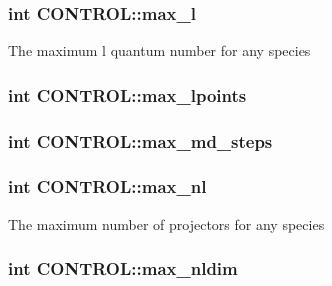 \hypertarget{struct_c_o_n_t_r_o_l_adf291a204dc806bab335d12c5bea8e51}{
\subsubsection[{max\-\_\-l}]{\setlength{\rightskip}{0pt plus 5cm}int C\-O\-N\-T\-R\-O\-L\-::max\-\_\-l}}\label{struct_c_o_n_t_r_o_l_adf291a204dc806bab335d12c5bea8e51}
The maximum l quantum number for any species \hypertarget{struct_c_o_n_t_r_o_l_aec8eaf77ca605bbbeb7c4d276935a177}{
\subsubsection[{max\-\_\-lpoints}]{\setlength{\rightskip}{0pt plus 5cm}int C\-O\-N\-T\-R\-O\-L\-::max\-\_\-lpoints}}\label{struct_c_o_n_t_r_o_l_aec8eaf77ca605bbbeb7c4d276935a177}
\hypertarget{struct_c_o_n_t_r_o_l_a155eb214f3cae8c0309868238d3b981f}{
\subsubsection[{max\-\_\-md\-\_\-steps}]{\setlength{\rightskip}{0pt plus 5cm}int C\-O\-N\-T\-R\-O\-L\-::max\-\_\-md\-\_\-steps}}\label{struct_c_o_n_t_r_o_l_a155eb214f3cae8c0309868238d3b981f}
\hypertarget{struct_c_o_n_t_r_o_l_a23abe0591ed301d111a6ae92a73e81a5}{
\subsubsection[{max\-\_\-nl}]{\setlength{\rightskip}{0pt plus 5cm}int C\-O\-N\-T\-R\-O\-L\-::max\-\_\-nl}}\label{struct_c_o_n_t_r_o_l_a23abe0591ed301d111a6ae92a73e81a5}
The maximum number of projectors for any species \hypertarget{struct_c_o_n_t_r_o_l_a0d3497dfab769a000d3ed06b85c2cf75}{
\subsubsection[{max\-\_\-nldim}]{\setlength{\rightskip}{0pt plus 5cm}int C\-O\-N\-T\-R\-O\-L\-::max\-\_\-nldim}}\label{struct_c_o_n_t_r_o_l_a0d3497dfab769a000d3ed06b85c2cf75}
